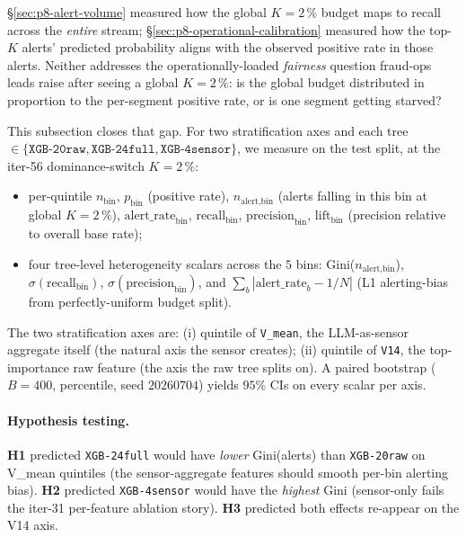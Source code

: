 \documentclass{article}
\begin{document}
\S\ref{sec:p8-alert-volume} measured how the global $K{=}2\,\%$ budget
maps to recall across the \emph{entire} stream;
\S\ref{sec:p8-operational-calibration} measured how the top-$K$ alerts'
predicted probability aligns with the observed positive rate in those
alerts. Neither addresses the operationally-loaded
\emph{fairness} question fraud-ops leads raise after seeing a global
$K{=}2\,\%$: is the global budget distributed in proportion to the
per-segment positive rate, or is one segment getting starved?

This subsection closes that gap. For two stratification axes and each
tree $\in \{\texttt{XGB-20raw}, \texttt{XGB-24full},
\texttt{XGB-4sensor}\}$, we measure on the test split, at the
iter-56 dominance-switch $K{=}2\,\%$:

\begin{itemize}
\item per-quintile $n_{\text{bin}}$, $p_{\text{bin}}$ (positive rate),
$n_{\text{alert},\text{bin}}$ (alerts falling in this bin at global
$K{=}2\,\%$), $\text{alert\_rate}_{\text{bin}}$, $\text{recall}_{\text{bin}}$,
$\text{precision}_{\text{bin}}$, $\text{lift}_{\text{bin}}$ (precision
relative to overall base rate);
\item four tree-level heterogeneity scalars across the $5$ bins:
Gini($n_{\text{alert},\text{bin}}$), $\sigma(\text{recall}_{\text{bin}})$,
$\sigma(\text{precision}_{\text{bin}})$, and $\sum_b |\text{alert\_rate}_b
- 1/N|$ (L1 alerting-bias from perfectly-uniform budget split).
\end{itemize}

The two stratification axes are: (i) quintile of \texttt{V\_mean}, the
LLM-as-sensor aggregate itself (the natural axis the sensor creates);
(ii) quintile of \texttt{V14}, the top-importance raw feature (the axis
the raw tree splits on). A paired bootstrap ($B{=}400$, percentile,
seed $20260704$) yields $95\%$ CIs on every scalar per axis.

\paragraph{Hypothesis testing.}
\textbf{H1} predicted \texttt{XGB-24full} would have \emph{lower}
Gini(alerts) than \texttt{XGB-20raw} on V\_mean quintiles
(the sensor-aggregate features should smooth per-bin alerting bias).
\textbf{H2} predicted \texttt{XGB-4sensor} would have the
\emph{highest} Gini (sensor-only fails the iter-31 per-feature ablation
story). \textbf{H3} predicted both effects re-appear on
the V14 axis.
\end{document}
